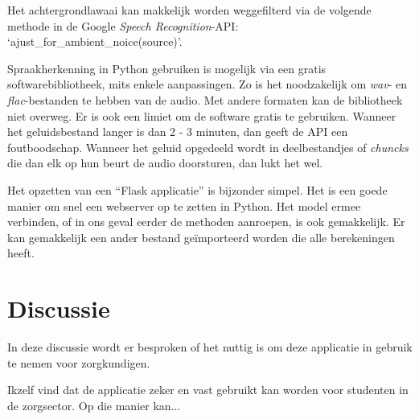 Het achtergrondlawaai kan makkelijk worden weggefilterd via de volgende methode in de Google \textit{Speech Recognition}-API: `ajust\_for\_ambient\_noice(source)'.

Spraakherkenning in Python gebruiken is mogelijk via een gratis softwarebibliotheek, mits enkele aanpassingen. Zo is het noodzakelijk om \textit{wav}- en \textit{flac}-bestanden te hebben van de audio. Met andere formaten kan de bibliotheek niet overweg. Er is ook een limiet om de software gratis te gebruiken. Wanneer het geluidsbestand langer is dan 2 - 3 minuten, dan geeft de API een foutboodschap. Wanneer het geluid opgedeeld wordt in deelbestandjes of \textit{chuncks} die dan elk op hun beurt de audio doorsturen, dan lukt het wel.

Het opzetten van een ``Flask applicatie'' is bijzonder simpel. Het is een goede manier om snel een webserver op te zetten in Python. Het model ermee verbinden, of in ons geval eerder de methoden aanroepen, is ook gemakkelijk. Er kan gemakkelijk een ander bestand geïmporteerd worden die alle berekeningen heeft.

\section{Discussie}
In deze discussie wordt er besproken of het nuttig is om deze applicatie in gebruik te nemen voor zorgkundigen.

Ikzelf vind dat de applicatie zeker en vast gebruikt kan worden voor studenten in de zorgsector. Op die manier kan...
